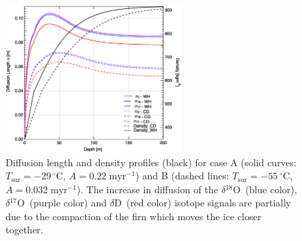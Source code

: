 \documentclass[11pt, draftcls, onecolumn]{IEEEtran} %
\numberwithin{equation}{section}
\numberwithin{table}{section}
\numberwithin{figure}{section}
\newcommand{\delOx}{$\delta{}^{18}\mathrm{O}$}
\newcommand{\delOxb}{$\delta{}^{17}\mathrm{O}$}
\newcommand{\delD}{$\delta\mathrm{D}$}
\begin{document}
\begin{figure}[]	
\vspace*{2mm}
	\begin{center}
			\includegraphics[width=0.6\textwidth]{Figure_1}
			\caption{Diffusion length and density profiles (black) for case A (solid curves: $T_{\mathrm{sur}} = -29 \,^{\circ} \mathrm{C}$,
				 $A = 0.22 \;\mathrm{myr^{-1}}$) and B (dashed lines: $T_{\mathrm{sur}} = -55 \,^{\circ} \mathrm{C}$,
				$A = 0.032 \;\mathrm{myr^{-1}}$). 
				The increase in diffusion of the \delOx~(blue color), \delOxb~(purple color) and \delD~(red color) isotope signals are
				partially due to the compaction of the firn which moves the ice closer together. } 		
		\label{fig:diffusion_length_profiles}
		\end{center}
\end{figure}

\end{document}
